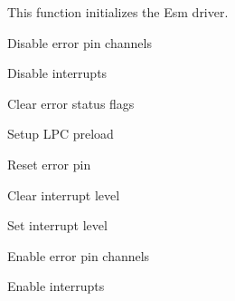 This function initializes the Esm driver. 
\begin{DoxyItemize}
\item Disable error pin channels ~\newline
~\newline
~\newline
~\newline
~\newline
~\newline
~\newline
~\newline

\item Disable interrupts ~\newline
~\newline
~\newline
~\newline
~\newline
~\newline
~\newline

\item Clear error status flags ~\newline
~\newline
~\newline
~\newline
~\newline
~\newline

\item Setup L\+PC preload ~\newline
~\newline
~\newline
~\newline
~\newline

\item Reset error pin ~\newline
~\newline
~\newline
~\newline

\item Clear interrupt level ~\newline
~\newline
~\newline

\item Set interrupt level ~\newline
~\newline

\item Enable error pin channels ~\newline

\item Enable interrupts 
\end{DoxyItemize}

